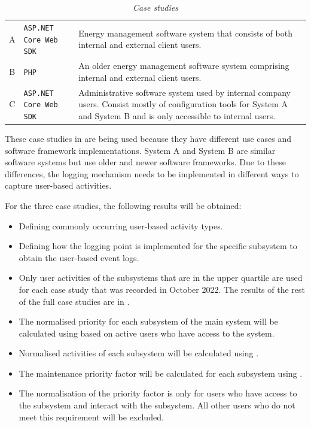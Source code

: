 \begin{table}[!htb]
	\centering
	\caption[Case studies]
	{\textit{Case studies}}
	\label{tbl:ch3_caseStudies}
	\begin{tabularx}{\textwidth}{clX}
		\toprule
		\thead{Case study} & \thead{Software framework} & \thead{Description} \\
		\midrule
		\rowcolor{lightgray}
		A & \texttt{ASP.NET Core Web SDK} & \RaggedRight Energy management software system that consists of both internal and external client users. \\
		B & \texttt{PHP} & \RaggedRight An older energy management software system comprising internal and external client users. \\
		\rowcolor{lightgray}
		C & \texttt{ASP.NET Core Web SDK} & \RaggedRight Administrative software system used by internal company users. Consist mostly of configuration tools for System A and System B and is only accessible to internal users. \\
		\bottomrule
	\end{tabularx}
\end{table}

These case studies in  are being used because they have different use cases and software framework implementations. System A and System B are similar software systems but use older and newer software frameworks. Due to these differences, the logging mechanism needs to be implemented in different ways to capture user-based activities. \par For the three case studies, the following results will be obtained:

\begin{itemize}
\item Defining commonly occurring user-based activity types.
\item Defining how the logging point is implemented for the specific subsystem to obtain the user-based event logs.
\item Only user activities of the subsystems that are in the upper quartile are used for each case study that was recorded in October 2022. The results of the rest of the full case studies are in .
\item The normalised priority for each subsystem of the main system will be calculated using  based on active users who have access to the system.
\item Normalised activities of each subsystem will be calculated using .
\item The maintenance priority factor will be calculated for each subsystem using .
\item The normalisation of the priority factor is only for users who have access to the subsystem and interact with the subsystem. All other users who do not meet this requirement will be excluded.
\end{itemize}

